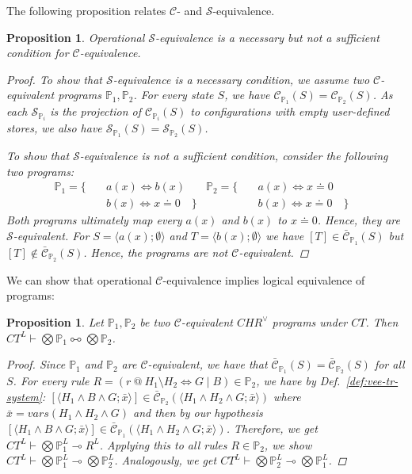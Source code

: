 \documentclass[acmtocl]{acmtrans2m}
\newtheorem{proposition}[theorem]{Proposition}
\newcommand\state[1]{\langle #1 \rangle}
\newcommand{\bbP}{\ensuremath{\mathbb{P}}}
\newcommand{\cS}{\ensuremath{\mathcal{S}}}
\newcommand{\cC}{\ensuremath{\mathcal{C}}}
\newcommand{\bcC}{\ensuremath{\bar{\mathcal{C}}}}
\newcommand{\bx}{\bar{x}}
\newcommand{\lp}{\multimap}
\newcommand{\lpl}{\multimapboth}
\begin{document}
The following proposition relates $\cC$- and $\cS$-equivalence.

\begin{proposition}\label{prop:op-equiv-hierarchy}
Operational $\cS$-equivalence is a necessary but not a
sufficient condition for $\cC$-equivalence.
\begin{proof}
To show that $\cS$-equivalence is a necessary condition, we assume two
$\cC$-equivalent programs $\bbP_1,\bbP_2$. For every state $S$, we have
$\cC_{\bbP_1}(S)=\cC_{\bbP_2}(S)$. As each $\cS_{\bbP_i}$ is the projection of
$\cC_{\bbP_i}(S)$ to configurations with empty user-defined stores, we also have
$\cS_{\bbP_1}(S)=\cS_{\bbP_2}(S)$.

To show that $\cS$-equivalence is not a sufficient condition, consider the
following two programs:
\begin{align*}
  \bbP_1 = \{ &\quad a(x)\Leftrightarrow b(x) &
  	\bbP_2 = \{ & \quad a(x)\Leftrightarrow x\doteq 0 \\
  & \quad b(x)\Leftrightarrow x\doteq 0 \quad \}&
  & \quad b(x)\Leftrightarrow x\doteq 0 \quad \}&
\end{align*}
Both programs ultimately map every $a(x)$ and $b(x)$ to $x\doteq 0$. Hence, they
are $\cS$-equivalent. For $S=\state{a(x);\emptyset}$ and
$T=\state{b(x);\emptyset}$ we have $[T]\in\bcC_{\bbP_1}(S)$ but
$[T]\not\in\bcC_{\bbP_2}(S)$. Hence, the programs are not $\cC$-equivalent.
\end{proof}
\end{proposition}

We can show that operational $\cC$-equivalence implies logical equivalence of
programs:

\begin{proposition}\label{prop:ll-equiv-impl-confl}Let $\bbP_1, \bbP_2$ be two
$\cC$-equivalent $CHR^\vee$ programs under $CT$. Then
$CT^L\vdash\bigotimes\bbP_1\lpl\bigotimes\bbP_2$.
\begin{proof}
Since $\bbP_1$ and $\bbP_2$ are $\cC$-equivalent, we have that
$\bcC_{\bbP_1}(S)=\bcC_{\bbP_2}(S)$ for all $S$.
For every rule $R=(r\ @\ H_1\setminus
H_2\Leftrightarrow G\mid B)\in\bbP_2$, we have by Def.~\ref{def:vee-tr-system}:
$[\state{H_1\wedge B\wedge
G;\bx}]\in\bcC_{\bbP_2}(\state{H_1\wedge H_2\wedge G;\bx})$
where
$\bx=vars(H_1\wedge H_2\wedge G)$ and then by our hypothesis $[\state{H_1\wedge
B\wedge G;\bx}]\in\bcC_{\bbP_1}(\state{H_1\wedge H_2\wedge G;\bx})$.
Therefore, we get $CT^L\vdash\bigotimes\bbP_1^L\lp R^L$. Applying this to all
rules $R\in\bbP_2$, we show $CT^L\vdash\bigotimes\bbP_1^L\lp\bigotimes\bbP_2^L$.
Analogously, we get $CT^L\vdash\bigotimes\bbP_2^L\lp\bigotimes\bbP_1^L$.
\end{proof}
\end{proposition}
\end{document}
